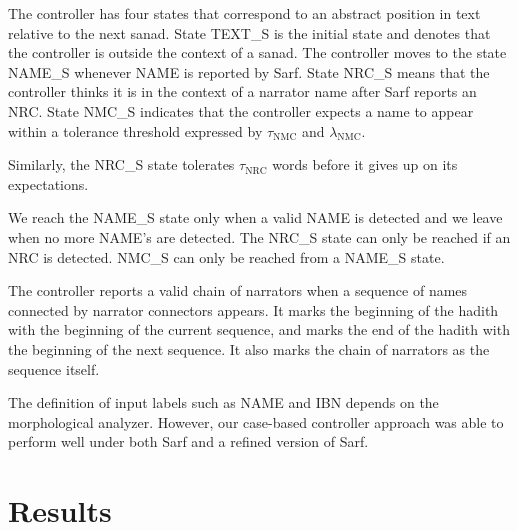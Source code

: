 \documentclass[11pt]{article}
\begin{document}
The controller has four states that correspond to 
an abstract position in text relative to the next sanad. 
State TEXT\_S is the initial state and denotes that
the controller is outside the context of a sanad.
The controller moves to the state NAME\_S whenever
NAME is reported by Sarf.
State NRC\_S means that the controller thinks it is in the context
of a narrator name after Sarf reports an NRC.
State NMC\_S
indicates that the controller expects a name to appear within 
a tolerance threshold expressed by 
$\tau_{\mbox{NMC}}$ and $\lambda_{\mbox{NMC}}$.

\begin{figure}[tb!]
\end{figure}

Similarly, the NRC\_S state tolerates $\tau_{\mbox{NRC}}$ words 
before it gives up on its expectations. 

We reach the NAME\_S state only when a
valid NAME is detected and we leave when no more NAME's are detected. 
The NRC\_S state can only be reached if an NRC is detected.
NMC\_S can only be reached from a NAME\_S state.

The controller reports a valid chain of narrators when a sequence of names
connected by narrator connectors appears. 
It marks the beginning of the hadith with the beginning of the current sequence,
and marks the end of the hadith with the beginning of the next sequence. 
It also marks the chain of narrators as the sequence itself. 

The definition of input labels such as NAME and IBN depends on the 
morphological analyzer. 
However, our case-based controller approach was able to perform well
under both Sarf and a refined version of Sarf.


\section{Results}
\label{sec:results}
\end{document}
